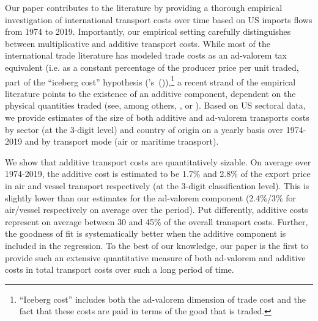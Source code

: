 \documentclass[a4paper,11pt]{article}
\newcommand\cites[1]{\citeauthor{#1}'s\ (\citeyear{#1})}
\begin{document}
Our paper contributes to the literature by providing a thorough empirical investigation of international transport costs over time based on US imports flows from 1974 to 2019. Importantly, our empirical setting carefully distinguishes between multiplicative and additive transport costs. While most of the international trade literature has modeled trade costs as an ad-valorem tax equivalent (i.e. as a constant percentage of the producer price per unit traded, part of the ``iceberg cost'' hypothesis (\cites{samuelson1954}),\footnote{``Iceberg cost'' includes both the ad-valorem dimension of trade cost and the fact that these costs are paid in terms of the good that is traded.} a recent strand of the empirical literature points to the existence of an additive component, dependent on the physical quantities traded (see, among others, \cite{Irrazabal_2015}, or \cite{martin2012}). Based on US sectoral data, we provide estimates of the size of both additive and ad-valorem transports costs by sector (at the 3-digit level) and country of origin on a yearly basis over 1974-2019 and by transport mode (air or maritime transport).\smallskip


We show that additive transport costs are quantitatively sizable. On average over 1974-2019, the additive cost is estimated to be 1.7\% and 2.8\% of the export price in air and vessel transport respectively (at the 3-digit classification level). This is slightly lower than our estimates for the ad-valorem component (2.4\%/3\% for air/vessel respectively on average over the period).
Put differently, additive costs represent on average between 30 and 45\% of the overall transport costs. Further, the goodness of fit is systematically better when the additive component is included in the regression. To the best of our knowledge, our paper is the first to provide such an extensive quantitative measure of both ad-valorem and additive costs in total transport costs over such a long period of time. \smallskip
\end{document}
